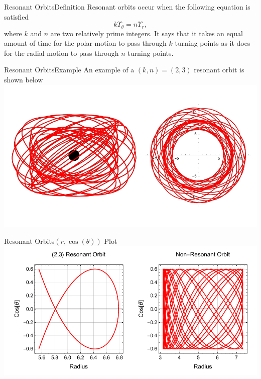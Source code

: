 \documentclass[12pt]{beamer}
\begin{document}
\begin{frame}{Resonant Orbits}{Definition}
Resonant orbits occur when the following equation is satisfied
\begin{equation}
	k\Upsilon_\theta=n\Upsilon_r,
\end{equation}
where $k$ and $n$ are two relatively prime integers.
\vskip12pt
It says that it takes an equal amount of time for the polar motion to pass through $k$
turning points as it does for the radial motion to pass through $n$ turning points.
\end{frame}

\begin{frame}{Resonant Orbits}{Example}
An example of a $(k,n)=(2,3)$ resonant orbit is shown below
\includegraphics[width=\textwidth]{kerrResoExample23.pdf}
\end{frame}

\begin{frame}{Resonant Orbits}{$(r,\cos(\theta))$ Plot}
    \centering
    \includegraphics[width=\textwidth]{kerrRThReso.pdf}
\end{frame}
\end{document}
